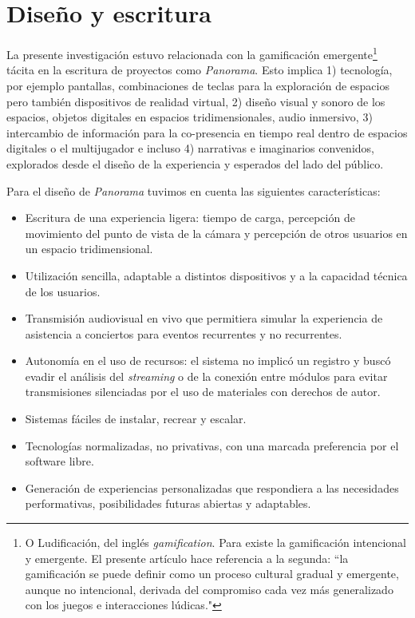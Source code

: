
\section*{Diseño y escritura} %

\color{BlueGreen}

La presente investigación estuvo relacionada con la gamificación emergente\footnote{O Ludificación, del inglés \textit{gamification}. Para \cite{gamificacion} existe la gamificación intencional y emergente. El presente artículo hace referencia a la segunda: ``la gamificación se puede definir como un proceso cultural gradual y emergente, aunque no intencional, derivada del compromiso cada vez más generalizado con los juegos e interacciones lúdicas."} tácita en la escritura de proyectos como \textit{Panorama}. Esto implica 1) tecnología, por ejemplo pantallas, combinaciones de teclas para la exploración de espacios pero también dispositivos de realidad virtual, 2) diseño visual y sonoro de los espacios, objetos digitales en espacios tridimensionales, audio inmersivo, 3) intercambio de información para la co-presencia en tiempo real dentro de espacios digitales o el multijugador e incluso 4) narrativas e imaginarios convenidos, explorados desde el diseño de la experiencia y esperados del lado del público. 

\color{black}

Para el diseño de \textit{Panorama} tuvimos en cuenta las siguientes características:

\begin{itemize}
\item Escritura de una experiencia ligera: tiempo de carga, percepción de movimiento del punto de vista de la cámara y percepción de otros usuarios en un espacio tridimensional.  
\item Utilización sencilla, adaptable a distintos dispositivos y a la capacidad técnica de los usuarios.
\item Transmisión audiovisual en vivo que permitiera simular la experiencia de asistencia a conciertos para eventos recurrentes y no recurrentes. 
\item Autonomía en el uso de recursos: el sistema no implicó un registro y buscó evadir el análisis del \textit{streaming} o de la conexión entre módulos para evitar transmisiones silenciadas por el uso de materiales con derechos de autor. 
\item Sistemas fáciles de instalar, recrear y escalar.
\item Tecnologías normalizadas, no privativas, con una marcada preferencia por el software libre.
\item Generación de experiencias personalizadas que respondiera a las necesidades performativas, posibilidades futuras abiertas y adaptables. 
\end{itemize}

